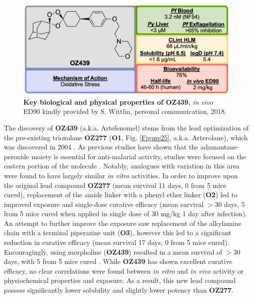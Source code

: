\documentclass[twocolumn]{bmcart}%
\begin{document}
\begin{figure}[h]
	\includegraphics [scale=0.575] {Figure24}
	\caption{{\bf Key biological and physical properties of OZ439.} \textit{in vivo} ED90 kindly provided by S. Wittlin, personal communication, 2018.}
	\label{Figure24}
\end{figure}

The discovery of \textbf{OZ439} (a.k.a. Artefenomel) stems from the lead optimization of the pre-existing trioxolane \textbf{OZ277} (\textbf{O1}, Fig. \ref{Figure25}, a.k.a. Arterolane), which was discovered in 2004 \cite{Vennerstrom2004,Dong2010}. As previous studies have shown that the adamantane-peroxide moiety is essential for anti-malarial activity, studies were focused on the eastern portion of the molecule \cite{Dong2005,Dong2006,Kaiser2007}. Notably, analogues with variation in this area were found to have largely similar \textit{in vitro} activities. In order to improve upon the original lead compound \textbf{OZ277} (mean survival 11 days, 0 from 5 mice cured), replacement of the amide linker with a phenyl ether linker (\textbf{O2}) led to improved exposure and single-dose curative efficacy (mean survival $>$30 days, 5 from 5 mice cured when applied in single dose of 30 mg/kg 1 day after infection). An attempt to further improve the exposure saw replacement of the alkylamine chain with a terminal piperazine unit (\textbf{O3}), however this led to a significant reduction in curative efficacy (mean survival 17 days, 0 from 5 mice cured). Encouragingly, using morpholine (\textbf{OZ439}) resulted in a mean survival of $>$30 days, with 5 from 5 mice cured \cite{Dong2017}. While \textbf{OZ439} has shown excellent curative efficacy, no clear correlations were found between \textit{in vitro} and \textit{in vivo} activity or physiochemical properties and exposure. As a result, this new lead compound possess significantly lower solubility and slightly lower potency than \textbf{OZ277}.
\end{document}
